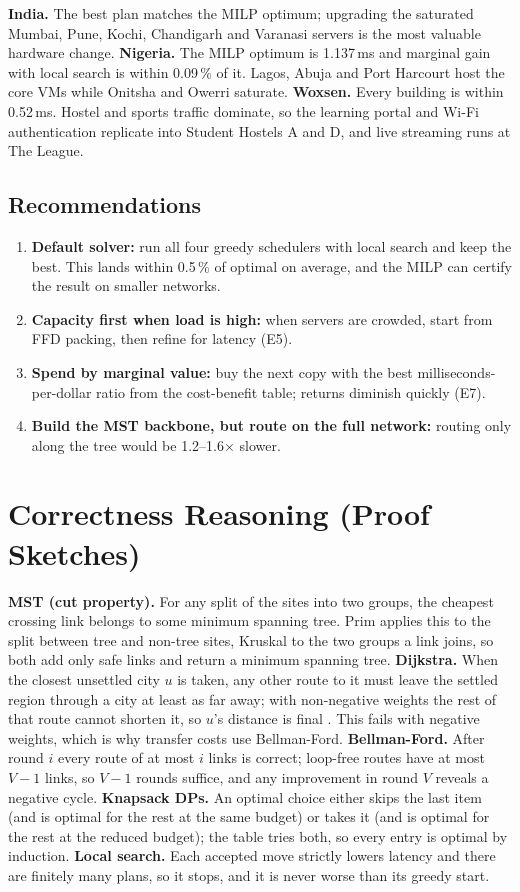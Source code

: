 \textbf{India.} The best plan matches the MILP optimum; upgrading the saturated Mumbai, Pune, Kochi, Chandigarh and Varanasi servers is the most valuable hardware change. \textbf{Nigeria.} The MILP optimum is 1.137\,ms and marginal gain with local search is within 0.09\,\% of it. Lagos, Abuja and Port Harcourt host the core VMs while Onitsha and Owerri saturate. \textbf{Woxsen.} Every building is within 0.52\,ms. Hostel and sports traffic dominate, so the learning portal and Wi-Fi authentication replicate into Student Hostels A and D, and live streaming runs at The League.

\subsection*{Recommendations}
\begin{enumerate}[leftmargin=*]
\item \textbf{Default solver:} run all four greedy schedulers with local search and keep the best. This lands within 0.5\,\% of optimal on average, and the MILP can certify the result on smaller networks.
\item \textbf{Capacity first when load is high:} when servers are crowded, start from FFD packing, then refine for latency (E5).
\item \textbf{Spend by marginal value:} buy the next copy with the best milliseconds-per-dollar ratio from the cost-benefit table; returns diminish quickly (E7).
\item \textbf{Build the MST backbone, but route on the full network:} routing only along the tree would be 1.2--1.6$\times$ slower.
\end{enumerate}

\section{Correctness Reasoning (Proof Sketches)}\label{sec:proofs}
\textbf{MST (cut property).} For any split of the sites into two groups, the cheapest crossing link belongs to some minimum spanning tree. Prim applies this to the split between tree and non-tree sites, Kruskal to the two groups a link joins, so both add only safe links and return a minimum spanning tree.
\textbf{Dijkstra.} When the closest unsettled city $u$ is taken, any other route to it must leave the settled region through a city at least as far away; with non-negative weights the rest of that route cannot shorten it, so $u$'s distance is final \cite{cormen2022}. This fails with negative weights, which is why transfer costs use Bellman-Ford.
\textbf{Bellman-Ford.} After round $i$ every route of at most $i$ links is correct; loop-free routes have at most $V-1$ links, so $V-1$ rounds suffice, and any improvement in round $V$ reveals a negative cycle.
\textbf{Knapsack DPs.} An optimal choice either skips the last item (and is optimal for the rest at the same budget) or takes it (and is optimal for the rest at the reduced budget); the table tries both, so every entry is optimal by induction.
\textbf{Local search.} Each accepted move strictly lowers latency and there are finitely many plans, so it stops, and it is never worse than its greedy start.


